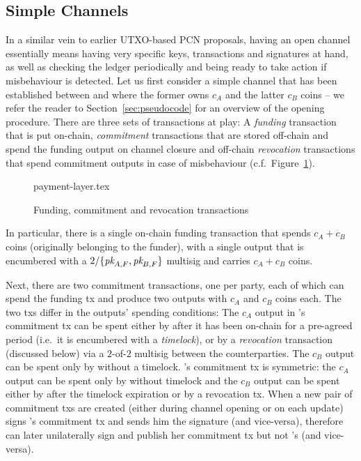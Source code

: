 \subsection{Simple Channels}
  In a similar vein to earlier UTXO-based PCN proposals, having an open channel essentially
  means having very specific keys, transactions and signatures at hand, as well
  as checking the ledger periodically and being ready to take action if
  misbehaviour is detected. Let us first consider a simple channel that has been
  established between \alice and \bob where the former owns $c_A$ and the latter
  $c_B$ coins -- we refer the reader to Section~\ref{sec:pseudocode} for an
  overview of the opening procedure. There are
  three sets of transactions at play: A \emph{funding}
  transaction that is put on-chain, \emph{commitment} transactions that are stored
  off-chain and
  spend the funding output on channel closure and off-chain \emph{revocation}
  transactions that spend commitment outputs in case of misbehaviour (c.f.\
  Figure~\ref{figure:payment-layer}).

  \begin{figure}
    \centering
    {payment-layer.tex}
    \caption{Funding, commitment and revocation transactions}
    \label{figure:payment-layer}
  \end{figure}

  In particular, there is a single on-chain funding transaction that spends $c_A
  + c_B$ coins (originally belonging to the funder), with a single output that is encumbered with a
  $2/\{\textit{pk}_{A, F}, \textit{pk}_{B, F}\}$ multisig and carries $c_A + c_B$ coins.

  Next, there are two commitment transactions, one per party, each of which can spend the
  funding tx and produce two outputs with $c_A$ and $c_B$ coins each. The two
  txs differ in the outputs' spending conditions: The $c_A$ output in \alice's
  commitment tx can be spent either by \alice after it has been on-chain for a
  pre-agreed period (i.e.\ it is encumbered with a \emph{timelock}), or by a
  \emph{revocation} transaction (discussed below) via a $2$-of-$2$ multisig between
  the counterparties. The $c_B$ output can be spent only by \bob without
  a timelock. \bob's commitment tx is symmetric: the $c_A$ output can be spent
  only by \alice without timelock and the $c_B$ output can be spent either by
  \bob after the timelock expiration or by a revocation tx. When a new pair of
  commitment txs are created (either during channel opening or on each update)
  \alice signs \bob's commitment tx and sends him the signature (and
  vice-versa), therefore \alice can later unilaterally sign and publish her commitment
  tx but not \bob's (and vice-versa).

